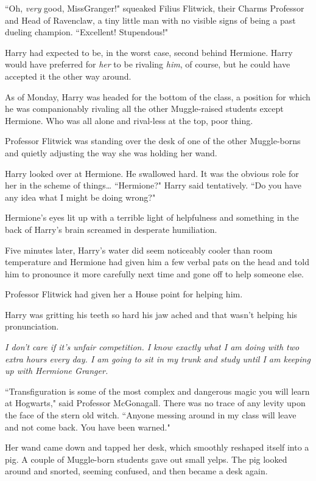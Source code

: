 ``Oh, \emph{very} good, Miss\?Granger!" squeaked Filius Flitwick, their Charms Professor and Head of Ravenclaw, a tiny little man with no visible signs of being a past dueling champion. ``Excellent! Stupendous!"

Harry had expected to be, in the worst case, second behind Hermione. Harry would have preferred for \emph{her} to be rivaling \emph{him}, of course, but he could have accepted it the other way around.

As of Monday, Harry was headed for the bottom of the class, a position for which he was companionably rivaling all the other Muggle-raised students except Hermione. Who was all alone and rival-less at the top, poor thing.

Professor Flitwick was standing over the desk of one of the other Muggle-borns and quietly adjusting the way she was holding her wand.

Harry looked over at Hermione. He swallowed hard. It was the obvious role for her in the scheme of things{\ldots} ``Hermione?" Harry said tentatively. ``Do you have any idea what I might be doing wrong?"

Hermione's eyes lit up with a terrible light of helpfulness and something in the back of Harry's brain screamed in desperate humiliation.

Five minutes later, Harry's water did seem noticeably cooler than room temperature and Hermione had given him a few verbal pats on the head and told him to pronounce it more carefully next time and gone off to help someone else.

Professor Flitwick had given her a House point for helping him.

Harry was gritting his teeth so hard his jaw ached and that wasn't helping his pronunciation.

\emph{I don't care if it's unfair competition. I know exactly what I am doing with two extra hours every day. I am going to sit in my trunk and study until I am keeping up with Hermione Granger.}

\later

``Transfiguration is some of the most complex and dangerous magic you will learn at Hogwarts," said Professor McGonagall. There was no trace of any levity upon the face of the stern old witch. ``Anyone messing around in my class will leave and not come back. You have been warned."

Her wand came down and tapped her desk, which smoothly reshaped itself into a pig. A couple of Muggle-born students gave out small yelps. The pig looked around and snorted, seeming confused, and then became a desk again.

